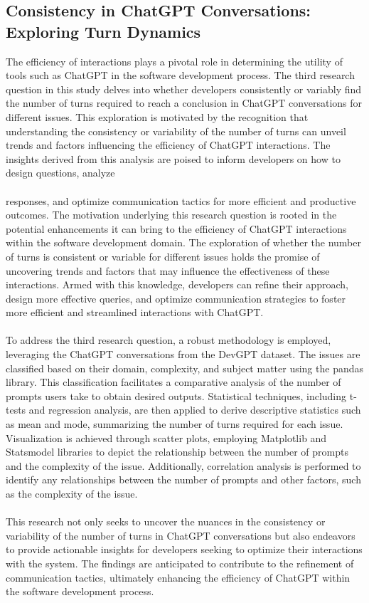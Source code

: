 \documentclass[journal]{IEEEtran}
\begin{document}
\subsection{Consistency in ChatGPT Conversations: Exploring Turn Dynamics}
The efficiency of interactions plays a pivotal role in determining the utility of tools such as ChatGPT in the software development process. The third research question in this study delves into whether developers consistently or variably find the number of turns required to reach a conclusion in ChatGPT conversations for different issues. This exploration is motivated by the recognition that understanding the consistency or variability of the number of turns can unveil trends and factors influencing the efficiency of ChatGPT interactions. The insights derived from this analysis are poised to inform developers on how to design questions, analyze
 \\ \\
responses, and optimize communication tactics for more efficient and productive outcomes.
The motivation underlying this research question is rooted in the potential enhancements it can bring to the efficiency of ChatGPT interactions within the software development domain. The exploration of whether the number of turns is consistent or variable for different issues holds the promise of uncovering trends and factors that may influence the effectiveness of these interactions. Armed with this knowledge, developers can refine their approach, design more effective queries, and optimize communication strategies to foster more efficient and streamlined interactions with ChatGPT.
\\ \\
To address the third research question, a robust methodology is employed, leveraging the ChatGPT conversations from the DevGPT dataset. The issues are classified based on their domain, complexity, and subject matter using the pandas library. This classification facilitates a comparative analysis of the number of prompts users take to obtain desired outputs. Statistical techniques, including t-tests and regression analysis, are then applied to derive descriptive statistics such as mean and mode, summarizing the number of turns required for each issue. Visualization is achieved through scatter plots, employing Matplotlib and Statsmodel libraries to depict the relationship between the number of prompts and the complexity of the issue. Additionally, correlation analysis is performed to identify any relationships between the number of prompts and other factors, such as the complexity of the issue.
\\ \\
This research not only seeks to uncover the nuances in the consistency or variability of the number of turns in ChatGPT conversations but also endeavors to provide actionable insights for developers seeking to optimize their interactions with the system. The findings are anticipated to contribute to the refinement of communication tactics, ultimately enhancing the efficiency of ChatGPT within the software development process.
\end{document}
